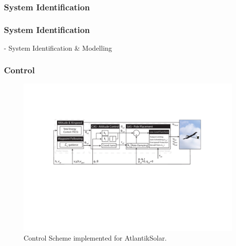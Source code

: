 \subsubsection{System Identification}
\subsubsection{System Identification} \label{sec:SystemID}
 - System Identification \& Modelling
 
 
 
 \subsubsection{Control}

\begin{figure}[tb]
    \centering
     \includegraphics[width=\linewidth]{images/11_ControlScheme/ControlScheme}
    \caption{Control Scheme implemented for AtlantikSolar.}
    \label{fig:ControlScheme}
\end{figure}


